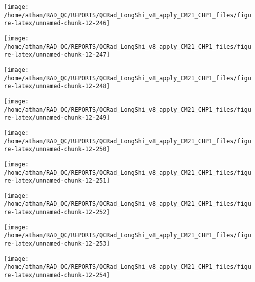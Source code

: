 \documentclass[
  10pt,
  a4paper,oneside]{article}
\begin{document}
\begin{center}\texttt{[image: /home/athan/RAD\_QC/REPORTS/QCRad\_LongShi\_v8\_apply\_CM21\_CHP1\_files/figure-latex/unnamed-chunk-12-246]} \end{center}

\begin{center}\texttt{[image: /home/athan/RAD\_QC/REPORTS/QCRad\_LongShi\_v8\_apply\_CM21\_CHP1\_files/figure-latex/unnamed-chunk-12-247]} \end{center}

\begin{center}\texttt{[image: /home/athan/RAD\_QC/REPORTS/QCRad\_LongShi\_v8\_apply\_CM21\_CHP1\_files/figure-latex/unnamed-chunk-12-248]} \end{center}

\begin{center}\texttt{[image: /home/athan/RAD\_QC/REPORTS/QCRad\_LongShi\_v8\_apply\_CM21\_CHP1\_files/figure-latex/unnamed-chunk-12-249]} \end{center}

\begin{center}\texttt{[image: /home/athan/RAD\_QC/REPORTS/QCRad\_LongShi\_v8\_apply\_CM21\_CHP1\_files/figure-latex/unnamed-chunk-12-250]} \end{center}

\begin{center}\texttt{[image: /home/athan/RAD\_QC/REPORTS/QCRad\_LongShi\_v8\_apply\_CM21\_CHP1\_files/figure-latex/unnamed-chunk-12-251]} \end{center}

\begin{center}\texttt{[image: /home/athan/RAD\_QC/REPORTS/QCRad\_LongShi\_v8\_apply\_CM21\_CHP1\_files/figure-latex/unnamed-chunk-12-252]} \end{center}

\begin{center}\texttt{[image: /home/athan/RAD\_QC/REPORTS/QCRad\_LongShi\_v8\_apply\_CM21\_CHP1\_files/figure-latex/unnamed-chunk-12-253]} \end{center}

\begin{center}\texttt{[image: /home/athan/RAD\_QC/REPORTS/QCRad\_LongShi\_v8\_apply\_CM21\_CHP1\_files/figure-latex/unnamed-chunk-12-254]} \end{center}
\end{document}
